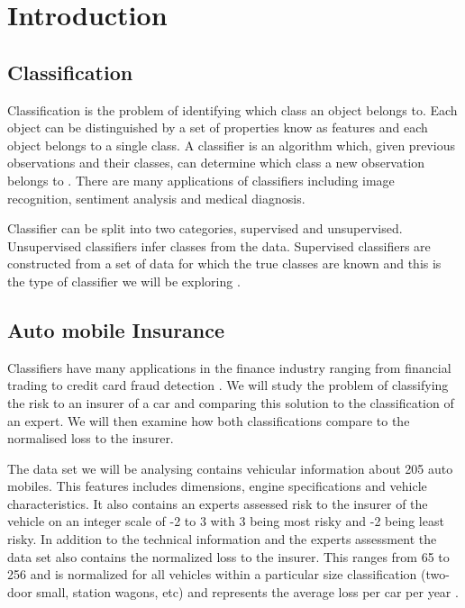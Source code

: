\chapter{Introduction}

\section{Classification}

Classification is the problem of identifying which class an object belongs to. Each object can be distinguished by a set of properties know as features and each object belongs to a single class. A classifier is an algorithm which, given previous observations and their classes, can determine which class a new observation belongs to \cite{Theodoridis03}. There are many applications of classifiers including image recognition, sentiment analysis and medical diagnosis.

Classifier can be split into two categories, supervised and unsupervised. Unsupervised classifiers infer classes from the data. Supervised classifiers are constructed from a set of data for which the true classes are known and this is the type of classifier we will be exploring \cite{Michie94}.

\section{Auto mobile Insurance}

Classifiers have many applications in the finance industry ranging from financial trading \cite{Gerlein16} to credit card fraud detection \cite{Pozzolo15}. We will study the problem of classifying the risk to an insurer of a car and comparing this solution to the classification of an expert. We will then examine how both classifications compare to the normalised loss to the insurer.

The data set we will be analysing contains vehicular information about 205 auto mobiles. This features includes dimensions, engine specifications and vehicle characteristics. It also contains an experts assessed risk to the insurer of the vehicle on an integer scale of -2 to 3 with 3 being most risky and -2 being least risky. In addition to the technical information and the experts assessment the data set also contains the normalized loss to the insurer. This ranges from 65 to 256 and is normalized for all vehicles within a particular size classification (two-door small, station wagons, etc) and represents the average loss per car per year \cite{Automobile}.



	
